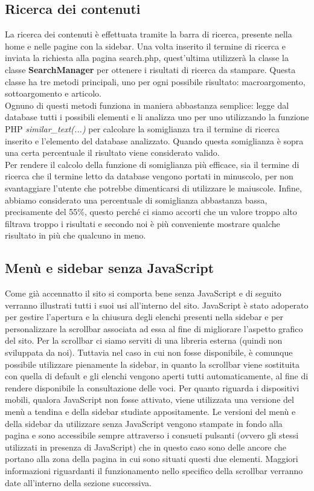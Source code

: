 \documentclass[12pt]{article}
\begin{document}
	\subsection{Ricerca dei contenuti}
	La ricerca dei contenuti è effettuata tramite la barra di ricerca, presente nella home e nelle pagine con la sidebar. Una volta inserito il termine di ricerca e inviata la richiesta alla pagina search.php, quest'ultima utilizzerà la classe la classe \textbf{SearchManager} per ottenere i risultati di ricerca da stampare. Questa classe ha tre metodi principali, uno per ogni possibile risultato: macroargomento, sottoargomento e articolo. \\
Ognuno di questi metodi funziona in maniera abbastanza semplice: legge dal database tutti i possibili elementi e li analizza uno per uno utilizzando la funzione PHP \textit{similar\_text(...)} per calcolare la somiglianza tra il termine di ricerca inserito e l'elemento del database analizzato. Quando questa somiglianza è sopra una certa percentuale il risultato viene considerato valido. \\
Per rendere il calcolo della funzione di somiglianza più efficace, sia il termine di ricerca che il termine letto da database vengono portati in minuscolo, per non svantaggiare l'utente che potrebbe dimenticarsi di utilizzare le maiuscole. Infine, abbiamo considerato una percentuale di somiglianza abbastanza bassa, precisamente del 55\%, questo perché ci siamo accorti che un valore troppo alto filtrava troppo i risultati e secondo noi è più conveniente mostrare qualche risultato in più che qualcuno in meno.
	
	\subsection{Menù e sidebar senza JavaScript}
		Come già accennatto il sito si comporta bene senza JavaScript e di seguito verranno illustrati tutti i suoi usi all'interno del sito.
		JavaScript è stato adoperato per gestire l'apertura e la chiusura degli elenchi presenti nella sidebar e per  personalizzare la scrollbar associata ad essa al fine di migliorare l'aspetto grafico del sito. Per la scrollbar ci siamo serviti di una libreria esterna (quindi non sviluppata da noi). Tuttavia nel caso in cui non fosse disponibile, è comunque possibile utilizzare pienamente la sidebar, in quanto la scrollbar viene sostituita con quella di default e gli elenchi vengono aperti tutti automaticamente, al fine di rendere disponibile la consultazione delle voci. Per quanto riguarda i dispositivi mobili, qualora JavaScript non fosse attivato, viene utilizzata una versione del menù a tendina e della sidebar studiate appositamente. Le versioni del menù e della sidebar da utilizzare senza JavaScript vengono stampate in fondo alla pagina e sono accessibile sempre attraverso i consueti pulsanti (ovvero gli stessi utilizzati in presenza di JavaScript) che in questo caso sono delle ancore che portano alla zona della pagina in cui sono situati questi due elementi.
		Maggiori informazioni riguardanti il funzionamento nello specifico della scrollbar verranno date all'interno della sezione successiva.
\end{document}
